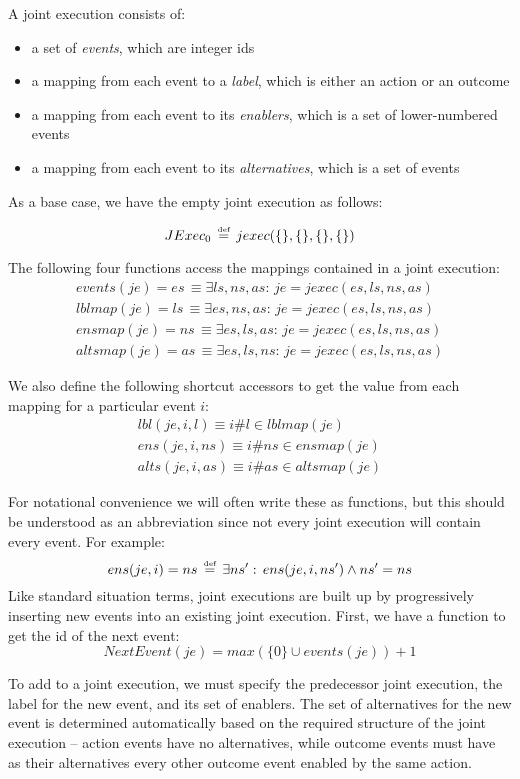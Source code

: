 A joint execution consists of:

\begin{itemize}
\item a set of \emph{events}, which are integer ids 
\item a mapping from each event to a \emph{label}, which is either an action
or an outcome 
\item a mapping from each event to its \emph{enablers}, which is a set of
lower-numbered events 
\item a mapping from each event to its \emph{alternatives}, which is a set
of events 
\end{itemize}
As a base case, we have the empty joint execution as follows:

\[
JExec_{0}\,\stackrel{\mbox{\tiny def}}{=}\, jexec(\{\},\{\},\{\},\{\})\]


The following four functions access the mappings contained in a joint
execution:\begin{gather*}
events(je)=es\,\equiv\exists ls,ns,as:\, je=jexec(es,ls,ns,as)\\
lblmap(je)=ls\,\equiv\exists es,ns,as:\, je=jexec(es,ls,ns,as)\\
ensmap(je)=ns\,\equiv\exists es,ls,as:\, je=jexec(es,ls,ns,as)\\
altsmap(je)=as\,\equiv\exists es,ls,ns:\, je=jexec(es,ls,ns,as)\end{gather*}


We also define the following shortcut accessors to get the value from
each mapping for a particular event $i$:\begin{gather*}
lbl(je,i,l)\equiv i\#l\in lblmap(je)\\
ens(je,i,ns)\equiv i\#ns\in ensmap(je)\\
alts(je,i,as)\equiv i\#as\in altsmap(je)\end{gather*}


For notational convenience we will often write these as functions,
but this should be understood as an abbreviation since not every joint
execution will contain every event. For example:\[
ens(je,i)=ns\,\stackrel{\mbox{\tiny def}}{=}\,\exists ns':\, ens(je,i,ns')\wedge ns'=ns\]
 Like standard situation terms, joint executions are built up by progressively
inserting new events into an existing joint execution. First, we have
a function to get the id of the next event:\[
NextEvent(je)=max(\{0\}\cup events(je))+1\]


To add to a joint execution, we must specify the predecessor joint
execution, the label for the new event, and its set of enablers. The
set of alternatives for the new event is determined automatically
based on the required structure of the joint execution -- action events
have no alternatives, while outcome events must have as their alternatives
every other outcome event enabled by the same action.

